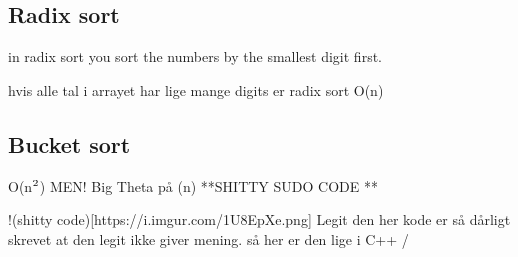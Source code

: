 \documentclass[letterpaper,10pt,danish]{sphinxmanual}
\begin{document}
\subsection{Radix sort}
\label{\detokenize{Algorithmer/Sorting:radix-sort}}
\sphinxAtStartPar
in radix sort you sort the numbers by the smallest digit first.

\sphinxAtStartPar
hvis alle tal i arrayet har lige mange digits er radix sort O(n)


\subsection{Bucket sort}
\label{\detokenize{Algorithmer/Sorting:bucket-sort}}
\sphinxAtStartPar
O(n\(\sp{\text{2}}\))
MEN!
Big Theta på (n)
**SHITTY SUDO CODE **

\sphinxAtStartPar
!(shitty code){[}https://i.imgur.com/1U8EpXe.png{]}
Legit den her kode er så dårligt skrevet at den legit ikke giver mening. så her er den lige i C++ /
\end{document}
